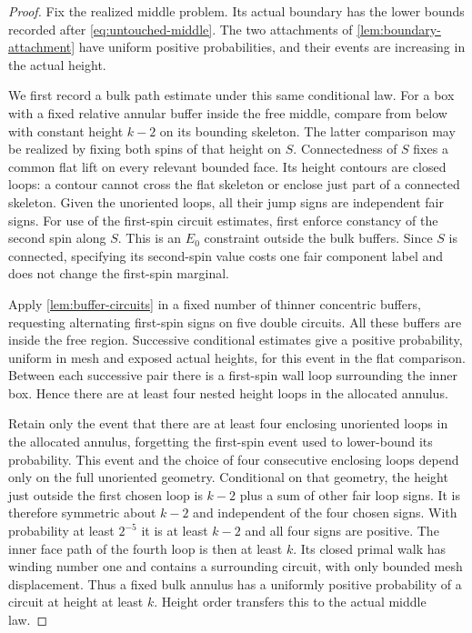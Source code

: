 \begin{proof}
Fix the realized middle problem.  Its actual boundary has the lower bounds
recorded after \eqref{eq:untouched-middle}.  The two attachments of
\cref{lem:boundary-attachment} have uniform positive probabilities, and
their events are increasing in the actual height.

We first record a bulk path estimate under this same conditional law.
For a box with a fixed relative annular buffer inside the free middle,
compare from below with constant height $k-2$ on its bounding skeleton.
The latter comparison may be realized by fixing both spins of that height
on $S$.  Connectedness of $S$ fixes a common flat lift on every relevant
bounded face.  Its height contours are closed loops: a contour cannot
cross the flat skeleton or enclose just part of a connected skeleton.
Given the unoriented loops, all their jump signs are independent fair signs.
For use of the first-spin circuit estimates, first enforce constancy of
the second spin along $S$.  This is an $E_0$ constraint outside the bulk
buffers.  Since $S$ is connected, specifying its second-spin value costs
one fair component label and does not change the first-spin marginal.

Apply \cref{lem:buffer-circuits} in a fixed number of thinner concentric
buffers, requesting alternating first-spin signs on five double circuits.
All these buffers are inside the free region.  Successive conditional
estimates give a positive probability, uniform in mesh and exposed actual
heights, for this event in the flat comparison.  Between each successive
pair there is a first-spin wall loop surrounding the inner box.  Hence
there are at least four nested height loops in the allocated annulus.

Retain only the event that there are at least four enclosing unoriented
loops in the allocated annulus, forgetting the first-spin event used to
lower-bound its probability.  This event and the choice of four consecutive
enclosing loops depend only on the full unoriented geometry.  Conditional
on that geometry, the height just outside the first chosen loop is $k-2$
plus a sum of other fair loop signs.  It is therefore symmetric about
$k-2$ and independent of the four chosen signs.  With probability at least
$2^{-5}$ it is at least $k-2$ and all four signs are positive.  The inner
face path of the fourth loop is then at least $k$.  Its closed primal walk
has winding number one and contains a surrounding circuit, with only
bounded mesh displacement.  Thus a fixed bulk annulus has a uniformly
positive probability of a circuit at height at least $k$.  Height order
transfers this to the actual middle law.


\end{proof}
